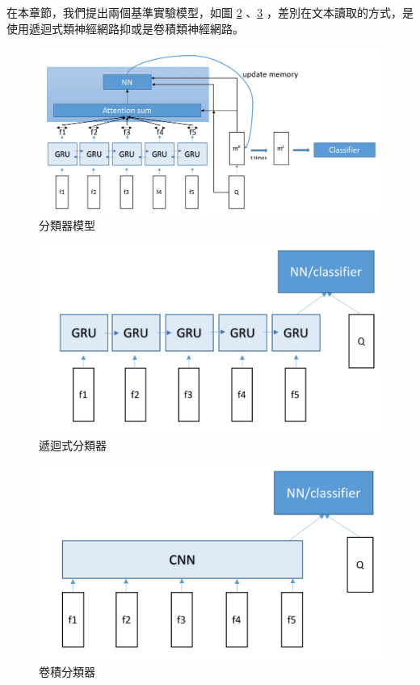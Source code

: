 在本章節，我們提出兩個基準實驗模型，如圖 \ref{fig:gru_classifier} 、\ref{fig:cnn_classifier} ，差別在文本讀取的方式，是使用遞迴式類神經網路抑或是卷積類神經網路。
\begin{figure}[h]
    \centering
    \includegraphics[scale=0.5]{images/chap4_dmn.png}
    \caption{分類器模型}
    \label{fig:dmn_classifier}
\end{figure}

\begin{figure}
    \centering
    \includegraphics[scale=0.5]{images/chap4_gru.png}
    \caption{遞迴式分類器}
    \label{fig:gru_classifier}
\end{figure}

\begin{figure}
    \centering
    \includegraphics[scale=0.5]{images/chap4_cnn.png}
    \caption{卷積分類器}
    \label{fig:cnn_classifier}
\end{figure}

